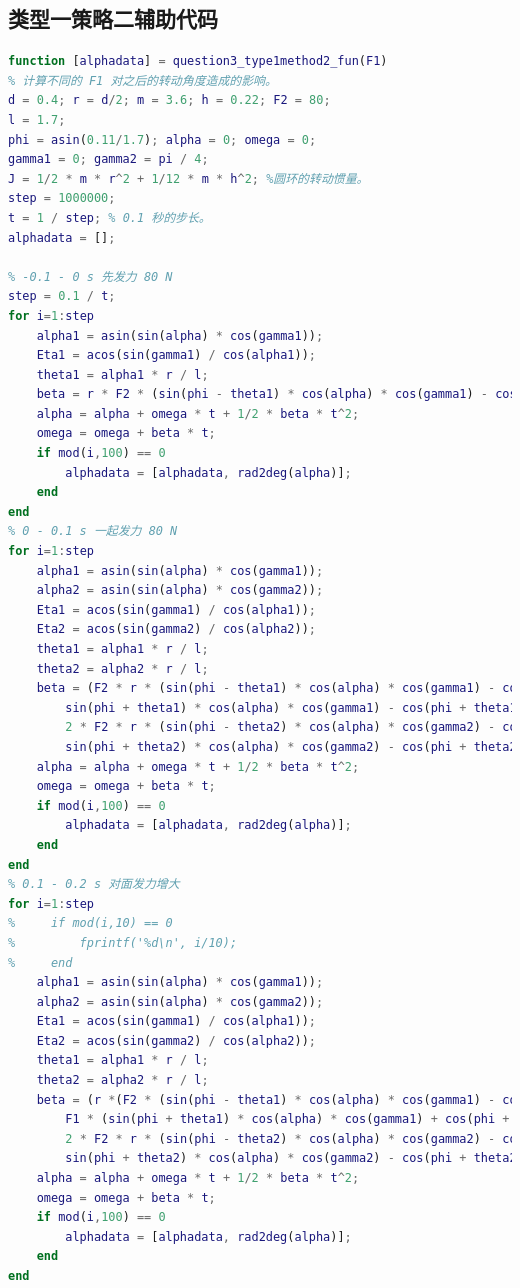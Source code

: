 \documentclass{cumcm}
\begin{document}
\subsection{类型一策略二辅助代码}
\begin{lstlisting}[language=matlab]
function [alphadata] = question3_type1method2_fun(F1)
% 计算不同的 F1 对之后的转动角度造成的影响。
d = 0.4; r = d/2; m = 3.6; h = 0.22; F2 = 80;
l = 1.7;
phi = asin(0.11/1.7); alpha = 0; omega = 0;
gamma1 = 0; gamma2 = pi / 4;
J = 1/2 * m * r^2 + 1/12 * m * h^2; %圆环的转动惯量。
step = 1000000;
t = 1 / step; % 0.1 秒的步长。
alphadata = [];

% -0.1 - 0 s 先发力 80 N
step = 0.1 / t;
for i=1:step
    alpha1 = asin(sin(alpha) * cos(gamma1));
    Eta1 = acos(sin(gamma1) / cos(alpha1));
    theta1 = alpha1 * r / l;
    beta = r * F2 * (sin(phi - theta1) * cos(alpha) * cos(gamma1) - cos(phi - theta1) * sin(alpha1) * sin(Eta1)) / J;
    alpha = alpha + omega * t + 1/2 * beta * t^2;
    omega = omega + beta * t;
    if mod(i,100) == 0
        alphadata = [alphadata, rad2deg(alpha)];
    end
end
% 0 - 0.1 s 一起发力 80 N
for i=1:step
    alpha1 = asin(sin(alpha) * cos(gamma1));
    alpha2 = asin(sin(alpha) * cos(gamma2));
    Eta1 = acos(sin(gamma1) / cos(alpha1));
    Eta2 = acos(sin(gamma2) / cos(alpha2));
    theta1 = alpha1 * r / l;
    theta2 = alpha2 * r / l;
    beta = (F2 * r * (sin(phi - theta1) * cos(alpha) * cos(gamma1) - cos(phi - theta1) * sin(alpha1) * sin(Eta1) - ...
        sin(phi + theta1) * cos(alpha) * cos(gamma1) - cos(phi + theta1) * sin(alpha1) * sin(Eta1)) + ...
        2 * F2 * r * (sin(phi - theta2) * cos(alpha) * cos(gamma2) - cos(phi - theta2) * sin(alpha2) * sin(Eta2) - ...
        sin(phi + theta2) * cos(alpha) * cos(gamma2) - cos(phi + theta2) * sin(alpha2) * sin(Eta2))) / J;
    alpha = alpha + omega * t + 1/2 * beta * t^2;
    omega = omega + beta * t;
    if mod(i,100) == 0
        alphadata = [alphadata, rad2deg(alpha)];
    end
end
% 0.1 - 0.2 s 对面发力增大
for i=1:step
%     if mod(i,10) == 0
%         fprintf('%d\n', i/10);
%     end
    alpha1 = asin(sin(alpha) * cos(gamma1));
    alpha2 = asin(sin(alpha) * cos(gamma2));
    Eta1 = acos(sin(gamma1) / cos(alpha1));
    Eta2 = acos(sin(gamma2) / cos(alpha2));
    theta1 = alpha1 * r / l;
    theta2 = alpha2 * r / l;
    beta = (r *(F2 * (sin(phi - theta1) * cos(alpha) * cos(gamma1) - cos(phi - theta1) * sin(alpha1) * sin(Eta1)) - ...
        F1 * (sin(phi + theta1) * cos(alpha) * cos(gamma1) + cos(phi + theta1) * sin(alpha1) * sin(Eta1))) + ...
        2 * F2 * r * (sin(phi - theta2) * cos(alpha) * cos(gamma2) - cos(phi - theta2) * sin(alpha2) * sin(Eta2) - ...
        sin(phi + theta2) * cos(alpha) * cos(gamma2) - cos(phi + theta2) * sin(alpha2) * sin(Eta2))) / J;
    alpha = alpha + omega * t + 1/2 * beta * t^2;
    omega = omega + beta * t;
    if mod(i,100) == 0
        alphadata = [alphadata, rad2deg(alpha)];
    end
end


\end{lstlisting}
\end{document}
